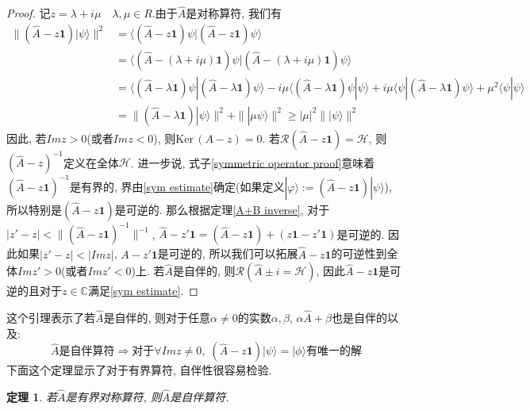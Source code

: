 \documentclass[a4paper,11pt]{book}
\newtheorem{theorem}{\hspace{2em}定理}[section]
\newtheorem{proof}{证明}[section]
\begin{document}
\begin{proof}
  记$z=\lambda+i\mu\quad\lambda,\mu\in R$.由于$\hat{A}$是对称算符, 我们有
\begin{equation}\label{symmetric operator proof}
  \begin{split}
     \|(\hat{A}-z\mathbf{1})|\psi\rangle\|^2 & =\langle(\hat{A}-z\mathbf{1})\psi|(\hat{A}-z\mathbf{1})\psi\rangle \\
       & =\langle(\hat{A}-(\lambda+i\mu)\mathbf{1})\psi|(\hat{A}-(\lambda+i\mu)\mathbf{1})\psi\rangle \\
       & =\langle(\hat{A}-\lambda\mathbf{1})\psi|(\hat{A}-\lambda\mathbf{1})\psi\rangle-i\mu\langle(\hat{A}-\lambda\mathbf{1})\psi|\psi\rangle+i\mu\langle\psi|(\hat{A}-\lambda\mathbf{1})\psi\rangle+\mu^2\langle\psi|\psi\rangle\\
       & =\|(\hat{A}-\lambda\mathbf{1})|\psi\rangle\|^2+\||\mu\psi\rangle\|^2\geq|\mu|^2\||\psi\rangle\|^2
  \end{split}
\end{equation}
因此, 若$Im z>0$(或者$Imz<0$), 则$\mathrm{Ker}\,(A-z)={0}$. 若$\mathcal{R}(\hat{A}-z\mathbf{1})=\mathcal{H}$, 则$(\hat{A}-z)^{-1}$定义在全体$\mathcal{H}$. 进一步说, 式子\eqref{symmetric operator proof}意味着$(\hat{A}-z\mathbf{1})^{-1}$是有界的, 界由\eqref{sym estimate}确定(如果定义$|\varphi\rangle:=(\hat{A}-z\mathbf{1})|\psi\rangle$), 所以特别是$(\hat{A}-z\mathbf{1})$是可逆的. 那么根据定理\ref{A+B inverse}, 对于$|z'-z|<\|(\hat{A}-z\mathbf{1})^{-1}\|^{-1}$, $\hat{A}-z'\mathbf{1}=(\hat{A}-z\mathbf{1})+(z\mathbf{1}-z'\mathbf{1})$是可逆的. 因此如果$|z'-z|<|Im z|$, $A-z'\mathbf{1}$是可逆的, 所以我们可以拓展$\hat{A}-z\mathbf{1}$的可逆性到全体$Im z'>0$(或者$Imz'<0$)上. 若$\hat{A}$是自伴的, 则$\mathcal{R}(\hat{A}\pm i=\mathcal{H})$, 因此$\hat{A}-z\mathbf{1}$是可逆的且对于$z\in\mathbb{C}$满足\ref{sym estimate}.
\end{proof}
这个引理表示了若$\hat{A}$是自伴的, 则对于任意$\alpha\neq0$的实数$\alpha,\beta$, $\alpha\hat{A}+\beta$也是自伴的以及:
\begin{equation*}
  \text{$\hat{A}$是自伴算符}\Rightarrow\text{对于$\forall Im z\neq0$},\; (\hat{A}-z\mathbf{1})|\psi\rangle=|\phi\rangle\text{有唯一的解}
\end{equation*}
下面这个定理显示了对于有界算符, 自伴性很容易检验.
\begin{theorem}
  若$\hat{A}$是有界对称算符, 则$\hat{A}$是自伴算符.
\end{theorem}
\end{document}
